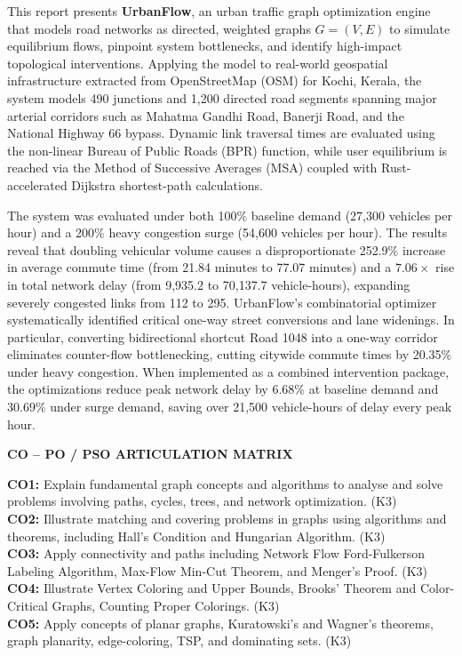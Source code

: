 \documentclass[12pt,a4paper]{report}
\begin{document}
This report presents \textbf{UrbanFlow}, an urban traffic graph optimization engine that models road networks as directed, weighted graphs $G = (V, E)$ to simulate equilibrium flows, pinpoint system bottlenecks, and identify high-impact topological interventions. Applying the model to real-world geospatial infrastructure extracted from OpenStreetMap (OSM) for Kochi, Kerala, the system models 490 junctions and 1,200 directed road segments spanning major arterial corridors such as Mahatma Gandhi Road, Banerji Road, and the National Highway 66 bypass. Dynamic link traversal times are evaluated using the non-linear Bureau of Public Roads (BPR) function, while user equilibrium is reached via the Method of Successive Averages (MSA) coupled with Rust-accelerated Dijkstra shortest-path calculations.

The system was evaluated under both 100\% baseline demand (27,300 vehicles per hour) and a 200\% heavy congestion surge (54,600 vehicles per hour). The results reveal that doubling vehicular volume causes a disproportionate 252.9\% increase in average commute time (from 21.84 minutes to 77.07 minutes) and a $7.06\times$ rise in total network delay (from 9,935.2 to 70,137.7 vehicle-hours), expanding severely congested links from 112 to 295. UrbanFlow's combinatorial optimizer systematically identified critical one-way street conversions and lane widenings. In particular, converting bidirectional shortcut Road 1048 into a one-way corridor eliminates counter-flow bottlenecking, cutting citywide commute times by 20.35\% under heavy congestion. When implemented as a combined intervention package, the optimizations reduce peak network delay by 6.68\% at baseline demand and 30.69\% under surge demand, saving over 21,500 vehicle-hours of delay every peak hour.

\newpage
{}

\begin{center}
    {\large\bfseries CO -- PO / PSO ARTICULATION MATRIX\par}
\end{center}
\vspace{0.2cm}
\noindent\small
\textbf{CO1:} Explain fundamental graph concepts and algorithms to analyse and solve problems involving paths, cycles, trees, and network optimization. (K3)\\
\textbf{CO2:} Illustrate matching and covering problems in graphs using algorithms and theorems, including Hall's Condition and Hungarian Algorithm. (K3)\\
\textbf{CO3:} Apply connectivity and paths including Network Flow Ford-Fulkerson Labeling Algorithm, Max-Flow Min-Cut Theorem, and Menger's Proof. (K3)\\
\textbf{CO4:} Illustrate Vertex Coloring and Upper Bounds, Brooks' Theorem and Color-Critical Graphs, Counting Proper Colorings. (K3)\\
\textbf{CO5:} Apply concepts of planar graphs, Kuratowski's and Wagner's theorems, graph planarity, edge-coloring, TSP, and dominating sets. (K3)
\end{document}
